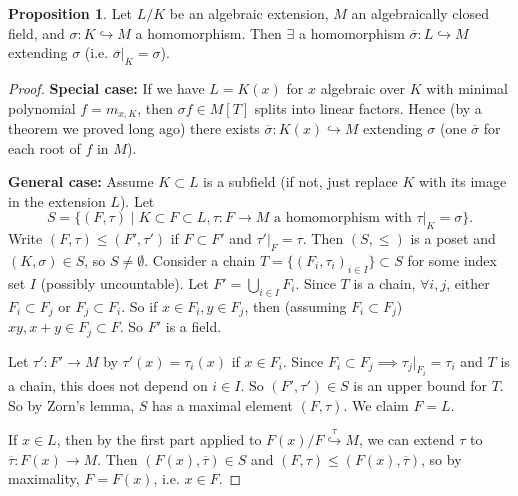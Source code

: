 \documentclass{article}
\theoremstyle{definition}
\newtheorem{prop}[theorem]{Proposition}
\begin{document}
\begin{prop}\label{14.5}
    Let $L/K$ be an algebraic extension, $M$ an algebraically closed field, and $\sigma : K \hookrightarrow M$ a homomorphism. Then $\exists$ a homomorphism $\overline{\sigma} : L \hookrightarrow M$ extending $\sigma$ (i.e. $\overline{\sigma}|_K = \sigma$).
\end{prop}
\begin{proof}
    \textbf{Special case:} If we have $L=K(x)$ for $x$ algebraic over $K$ with minimal polynomial $f=m_{x,K}$, then $\sigma f \in M[T]$ splits into linear factors. Hence (by a theorem we proved long ago) there exists $\overline{\sigma} : K(x) \hookrightarrow M$ extending $\sigma$ (one $\overline{\sigma}$ for each root of $f$ in $M$).
    \vspace{1mm}
    
    \textbf{General case:} Assume $K \subset L$ is a subfield (if not, just replace $K$ with its image in the extension $L$). Let \[
    S = \{(F,\tau) \mid K \subset F \subset L, \tau : F \to M \text{ a homomorphism with }\tau|_K = \sigma\}.
    \]
    Write $(F,\tau) \le (F', \tau')$ if $F \subset F'$ and $\tau'|_F=\tau$. Then $(S,\le )$ is a poset and $(K,\sigma) \in S$, so $S \neq \emptyset$. Consider a chain $T = \{(F_i, \tau_i)_{i \in I}\}\subset S$ for some index set $I$ (possibly uncountable). Let $F' = \bigcup_{i \in  I} F_i$. Since $T$ is a chain, $\forall i,j$, either $F_i \subset F_j$ or $F_j \subset F_i$. So if $x \in F_i, y \in F_j$, then (assuming $F_i \subset F_j$) $xy,x+y \in F_j \subset F$. So $F'$ is a field.
    \vspace{1mm}
    
    Let $\tau' : F' \to M$ by $\tau'(x)=\tau_i(x)$ if $x \in F_i$. Since $F_i \subset F_j \implies \tau_j|_{F_i} = \tau_i$ and $T$ is a chain, this does not depend on $i \in I$. So $(F',\tau') \in S$ is an upper bound for $T$. So by Zorn's lemma, $S$ has a maximal element $(F,\tau)$. We claim $F=L$.
    \vspace{1mm}
    
    If $x \in L$, then by the first part applied to $F(x)/F \stackrel{\tau}{\hookrightarrow} M$, we can extend $\tau$ to $\overline{\tau}: F(x)\to M$. Then $(F(x),\overline{\tau}) \in S$ and $(F,\tau)\le (F(x),\overline{\tau})$, so by maximality, $F=F(x)$, i.e. $x \in F$.
\end{proof}
\end{document}

